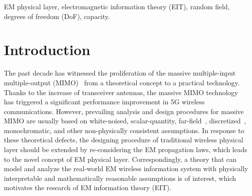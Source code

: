 \documentclass[journal,twocolumn]{IEEEtran}
\newcommand{\red}[1]{{\color{red}{#1}}}
\begin{document}
\begin{IEEEkeywords}
    EM physical layer, electromagnetic information theory (EIT), random field, degrees of freedom (DoF), capacity.  
\end{IEEEkeywords}

\vspace{-0.5em}
\section{Introduction} \label{sec-intro}
The past decade has witnessed the proliferation of the massive multiple-input multiple-output (MIMO)~\cite{marzetta2010noncooperative} from a theoretical concept to a practical technology. Thanks to the increase of transceiver antennas, the massive MIMO technology has triggered a significant performance improvement in 5G wireless communications. 
However, prevailing analysis and design procedures for massive MIMO are usually based on white-noised, scalar-quantity, far-field~\cite{liu2018novel}, discretized~\cite{goldsmith2003capacity}, monochromatic, and other non-physically consistent assumptions. 
\red{These assumptions will gradually become invalid when an ultradense MIMO, i.e., a continuous-aperture MIMO (CAP-MIMO), is considered. For example, the noise observed at each antenna will exhibit two distinct properties as the number of antennas grows. First, the noise will become correlated due to the strengthened electromagnetic (EM) mutual coupling. Second, the noise power will increase because of the exacerbated thermal fluctuation within small volumes. Both of these two effects will cause the traditional MIMO information-theoretic models to over-estimate the channel capacity, leading to mismatches between the system design and the actual wireless channel properties in the novel architectures beyond massive MIMO.} 
In response to these theoretical defects, the designing procedure of traditional wireless physical layer should be extended by re-considering the EM propagation laws, which leads to the novel concept of EM physical layer. 
Correspondingly, a theory that can model and analyze the real-world EM wireless information system with physically interpretable and mathematically reasonable assumptions is of interest, which motivates the research of EM information theory (EIT). 
\end{document}
